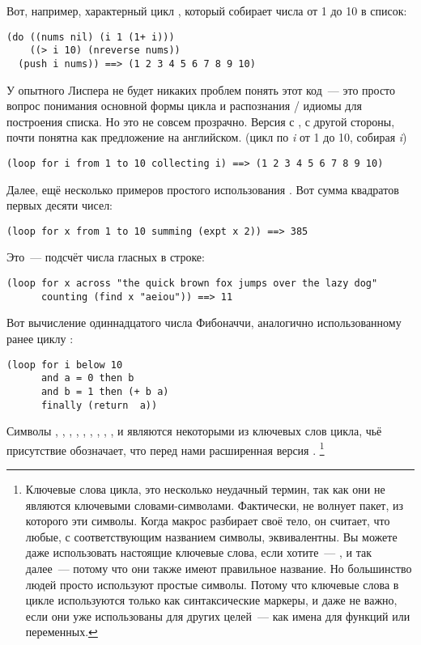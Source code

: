 Вот, например, характерный цикл , который собирает числа от 1 до 10 в список:

\begin{lstlisting}
(do ((nums nil) (i 1 (1+ i)))
    ((> i 10) (nreverse nums))
  (push i nums)) ==> (1 2 3 4 5 6 7 8 9 10)
\end{lstlisting}

У опытного Лиспера не будет никаких проблем понять этот код~--- это просто вопрос
понимания основной формы  цикла и распознания / идиомы
для построения списка. Но это не совсем прозрачно. Версия с , с другой стороны,
почти понятна как предложение на английском. (цикл по \textit{i} от 1 до 10, собирая
\textit{i})

\begin{lstlisting}
(loop for i from 1 to 10 collecting i) ==> (1 2 3 4 5 6 7 8 9 10)
\end{lstlisting}

Далее, ещё несколько примеров простого использования . Вот сумма квадратов
первых десяти чисел:

\begin{lstlisting}
(loop for x from 1 to 10 summing (expt x 2)) ==> 385
\end{lstlisting}

Это~--- подсчёт числа гласных в строке:

\begin{lstlisting}
(loop for x across "the quick brown fox jumps over the lazy dog"
      counting (find x "aeiou")) ==> 11
\end{lstlisting}

Вот вычисление одиннадцатого числа Фибоначчи, аналогично использованному ранее циклу :

\begin{lstlisting}
(loop for i below 10
      and a = 0 then b
      and b = 1 then (+ b a)
      finally (return  a))
\end{lstlisting}

Символы , , , , ,
, , , ,  и  являются
некоторыми из ключевых слов цикла, чьё присутствие обозначает, что перед нами расширенная
версия . \footnote{Ключевые слова цикла, это несколько неудачный термин, так
  как они не являются ключевыми словами-символами. Фактически,  не волнует
  пакет, из которого эти символы. Когда макрос  разбирает своё тело, он
  считает, что любые, с соответствующим названием символы, эквивалентны. Вы можете даже
  использовать настоящие ключевые слова, если хотите~--- ,  и так
  далее~--- потому что они также имеют правильное название. Но большинство людей просто
  используют простые символы. Потому что ключевые слова в цикле используются только как
  синтаксические маркеры, и даже не важно, если они уже использованы для других целей~---
  как имена для функций или переменных.}


